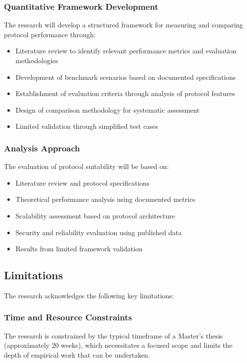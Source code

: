 \documentclass[12pt,a4paper]{article}
\begin{document}
\subsubsection{Quantitative Framework Development}
The research will develop a structured framework for measuring and comparing protocol performance through:
\begin{itemize}
    \item Literature review to identify relevant performance metrics and evaluation methodologies
    \item Development of benchmark scenarios based on documented specifications
    \item Establishment of evaluation criteria through analysis of protocol features
    \item Design of comparison methodology for systematic assessment
    \item Limited validation through simplified test cases
\end{itemize}

\subsubsection{Analysis Approach}
The evaluation of protocol suitability will be based on:
\begin{itemize}
    \item Literature review and protocol specifications
    \item Theoretical performance analysis using documented metrics
    \item Scalability assessment based on protocol architecture
    \item Security and reliability evaluation using published data
    \item Results from limited framework validation
\end{itemize}

\subsection{Limitations}

The research acknowledges the following key limitations:

\subsubsection{Time and Resource Constraints}
The research is constrained by the typical timeframe of a Master's thesis (approximately 20 weeks), which necessitates a focused scope and limits the depth of empirical work that can be undertaken.
\end{document}
